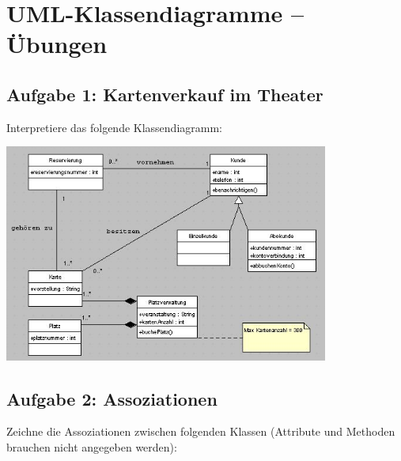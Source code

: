 \clearpage

\rehead[]{\textcolor{lightblue}{AvHG, Inf, My}}
\lohead[]{\textcolor{lightblue}{AvHG, Inf, My}}

\section{UML-Klassendiagramme -- Übungen}

\subsection{Aufgabe 1: Kartenverkauf im Theater}

Interpretiere das folgende Klassendiagramm:

\includegraphics[width=0.8\textwidth]{./inf/SEKII/15_UML_Klassendiagramme/Aufgabe1.png}

\subsection{Aufgabe 2: Assoziationen}

Zeichne die Assoziationen zwischen folgenden Klassen (Attribute und Methoden brauchen nicht angegeben
werden):

